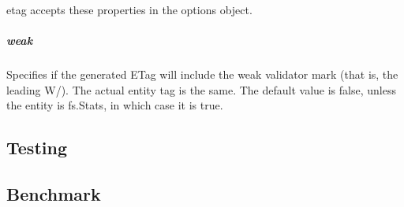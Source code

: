 {\ttfamily etag} accepts these properties in the options object.

\subparagraph*{weak}

Specifies if the generated E\+Tag will include the weak validator mark (that is, the leading {\ttfamily W/}). The actual entity tag is the same. The default value is {\ttfamily false}, unless the {\ttfamily entity} is {\ttfamily fs.\+Stats}, in which case it is {\ttfamily true}.

\subsection*{Testing}




\subsection*{Benchmark}


